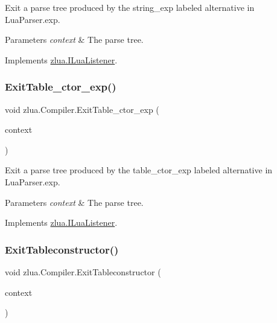 Exit a parse tree produced by the {\ttfamily string\+\_\+exp} labeled alternative in Lua\+Parser.\+exp. 


\begin{DoxyParams}{Parameters}
{\em context} & The parse tree.\\
\hline
\end{DoxyParams}


Implements \mbox{\hyperlink{interfacezlua_1_1_i_lua_listener_adaa28943f1961d32164acc489c86f308}{zlua.\+I\+Lua\+Listener}}.

\mbox{\label{classzlua_1_1_compiler_a5bcebfe8e9a0771dff337a0db7cd6e25}} 
\subsubsection{\texorpdfstring{Exit\+Table\+\_\+ctor\+\_\+exp()}{ExitTable\_ctor\_exp()}}
{\footnotesize\ttfamily void zlua.\+Compiler.\+Exit\+Table\+\_\+ctor\+\_\+exp (\begin{DoxyParamCaption}\item[{\mbox{[}\+Not\+Null\mbox{]} \mbox{\hyperlink{classzlua_1_1_lua_parser_1_1_table__ctor__exp_context}{Lua\+Parser.\+Table\+\_\+ctor\+\_\+exp\+Context}}}]{context }\end{DoxyParamCaption})}



Exit a parse tree produced by the {\ttfamily table\+\_\+ctor\+\_\+exp} labeled alternative in Lua\+Parser.\+exp. 


\begin{DoxyParams}{Parameters}
{\em context} & The parse tree.\\
\hline
\end{DoxyParams}


Implements \mbox{\hyperlink{interfacezlua_1_1_i_lua_listener_a30a4acd429120b15838dc24ddb201fc6}{zlua.\+I\+Lua\+Listener}}.

\mbox{\label{classzlua_1_1_compiler_a9169c6cb5853ae3dca1399bf9d99e6d0}} 
\subsubsection{\texorpdfstring{Exit\+Tableconstructor()}{ExitTableconstructor()}}
{\footnotesize\ttfamily void zlua.\+Compiler.\+Exit\+Tableconstructor (\begin{DoxyParamCaption}\item[{\mbox{[}\+Not\+Null\mbox{]} \mbox{\hyperlink{classzlua_1_1_lua_parser_1_1_tableconstructor_context}{Lua\+Parser.\+Tableconstructor\+Context}}}]{context }\end{DoxyParamCaption})}



